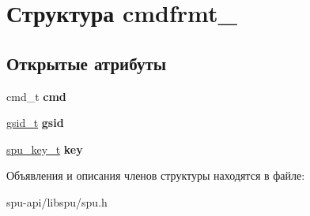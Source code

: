 \hypertarget{structcmdfrmt__2}{}\section{Структура cmdfrmt\+\_}
\label{structcmdfrmt__2}
\subsection*{Открытые атрибуты}
\begin{DoxyCompactItemize}
\item 
\mbox{\label{structcmdfrmt__2_adab70b9e159adb970b2f883bb3d6b1f7}} 
cmd\+\_\+t {\bfseries cmd}
\item 
\mbox{\label{structcmdfrmt__2_adf1c31d526261fad70f22ca28946f69a}} 
\hyperlink{structgsid__container}{gsid\+\_\+t} {\bfseries gsid}
\item 
\mbox{\label{structcmdfrmt__2_a9f0d6bbf45c4b31300e0b1311edf6570}} 
\hyperlink{structdata__container}{spu\+\_\+key\+\_\+t} {\bfseries key}
\end{DoxyCompactItemize}


Объявления и описания членов структуры находятся в файле\+:\begin{DoxyCompactItemize}
\item 
spu-\/api/libspu/spu.\+h\end{DoxyCompactItemize}
